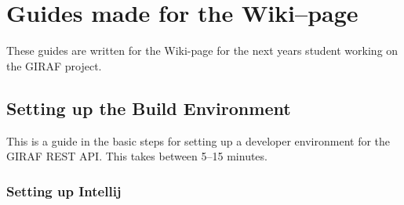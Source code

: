 \chapter{Guides made for the Wiki--page}\label{app:restdevenv}
These guides are written for the Wiki-page for the next years student working on the GIRAF project.

\section{Setting up the Build Environment}
This is a guide in the basic steps for setting up a developer environment for the GIRAF REST API.
This takes between 5--15 minutes.
\subsection*{Setting up Intellij}
